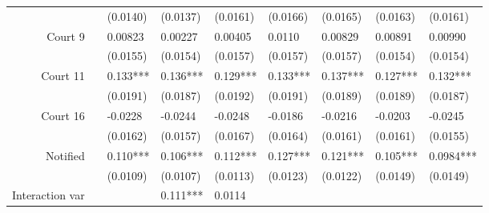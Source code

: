 \begin{tabular}{rrrrrrrrr}
      & \multicolumn{1}{l}{} & \multicolumn{1}{l}{(0.0140)} & \multicolumn{1}{l}{(0.0137)} & \multicolumn{1}{l}{(0.0161)} & \multicolumn{1}{l}{(0.0166)} & \multicolumn{1}{l}{(0.0165)} & \multicolumn{1}{l}{(0.0163)} & \multicolumn{1}{l}{(0.0161)} \\
Court 9 & \multicolumn{1}{l}{} & \multicolumn{1}{l}{0.00823} & \multicolumn{1}{l}{0.00227} & \multicolumn{1}{l}{0.00405} & \multicolumn{1}{l}{0.0110} & \multicolumn{1}{l}{0.00829} & \multicolumn{1}{l}{0.00891} & \multicolumn{1}{l}{0.00990} \\
      & \multicolumn{1}{l}{} & \multicolumn{1}{l}{(0.0155)} & \multicolumn{1}{l}{(0.0154)} & \multicolumn{1}{l}{(0.0157)} & \multicolumn{1}{l}{(0.0157)} & \multicolumn{1}{l}{(0.0157)} & \multicolumn{1}{l}{(0.0154)} & \multicolumn{1}{l}{(0.0154)} \\
Court 11 & \multicolumn{1}{l}{} & \multicolumn{1}{l}{0.133***} & \multicolumn{1}{l}{0.136***} & \multicolumn{1}{l}{0.129***} & \multicolumn{1}{l}{0.133***} & \multicolumn{1}{l}{0.137***} & \multicolumn{1}{l}{0.127***} & \multicolumn{1}{l}{0.132***} \\
      & \multicolumn{1}{l}{} & \multicolumn{1}{l}{(0.0191)} & \multicolumn{1}{l}{(0.0187)} & \multicolumn{1}{l}{(0.0192)} & \multicolumn{1}{l}{(0.0191)} & \multicolumn{1}{l}{(0.0189)} & \multicolumn{1}{l}{(0.0189)} & \multicolumn{1}{l}{(0.0187)} \\
Court 16 & \multicolumn{1}{l}{} & \multicolumn{1}{l}{-0.0228} & \multicolumn{1}{l}{-0.0244} & \multicolumn{1}{l}{-0.0248} & \multicolumn{1}{l}{-0.0186} & \multicolumn{1}{l}{-0.0216} & \multicolumn{1}{l}{-0.0203} & \multicolumn{1}{l}{-0.0245} \\
      & \multicolumn{1}{l}{} & \multicolumn{1}{l}{(0.0162)} & \multicolumn{1}{l}{(0.0157)} & \multicolumn{1}{l}{(0.0167)} & \multicolumn{1}{l}{(0.0164)} & \multicolumn{1}{l}{(0.0161)} & \multicolumn{1}{l}{(0.0161)} & \multicolumn{1}{l}{(0.0155)} \\
Notified & \multicolumn{1}{l}{} & \multicolumn{1}{l}{0.110***} & \multicolumn{1}{l}{0.106***} & \multicolumn{1}{l}{0.112***} & \multicolumn{1}{l}{0.127***} & \multicolumn{1}{l}{0.121***} & \multicolumn{1}{l}{0.105***} & \multicolumn{1}{l}{0.0984***} \\
      & \multicolumn{1}{l}{} & \multicolumn{1}{l}{(0.0109)} & \multicolumn{1}{l}{(0.0107)} & \multicolumn{1}{l}{(0.0113)} & \multicolumn{1}{l}{(0.0123)} & \multicolumn{1}{l}{(0.0122)} & \multicolumn{1}{l}{(0.0149)} & \multicolumn{1}{l}{(0.0149)} \\
Interaction var & \multicolumn{1}{l}{} & \multicolumn{1}{l}{} & \multicolumn{1}{l}{0.111***} & \multicolumn{1}{l}{0.0114} & \multicolumn{1}{l}{} & \multicolumn{1}{l}{} & \multicolumn{1}{l}{} & \multicolumn{1}{l}{} \\

\end{tabular}
